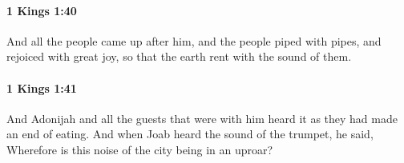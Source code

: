		\paragraph{1 Kings 1:40} %
			\label{1KINGS-1-40}

			And all the people came up after him, and the people piped with pipes, and rejoiced with great joy, so that the earth rent with the sound of them.


		\paragraph{1 Kings 1:41} %
			\label{1KINGS-1-41}

			And Adonijah and all the guests that were with him heard it as they had made an end of eating. And when Joab heard the sound of the trumpet, he said, Wherefore is this noise of the city being in an uproar?



